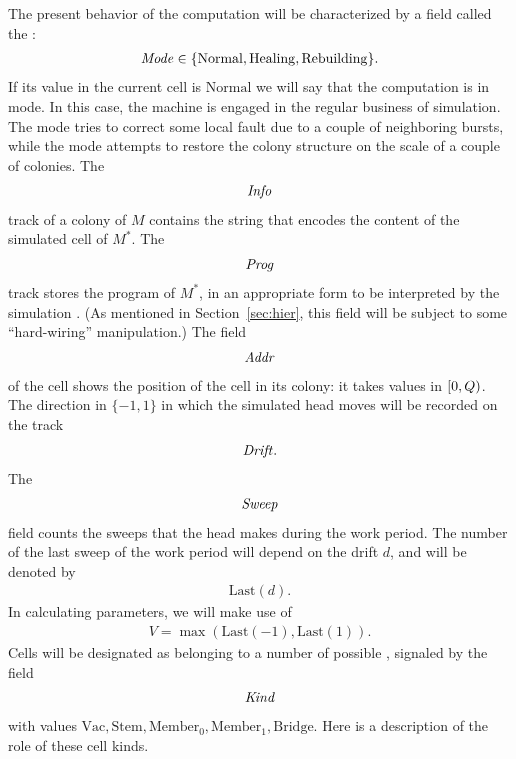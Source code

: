 \documentclass[11pt]{memoir}
\theoremstyle{definition} %
\newcommand{\fld}[1]{\ensuremath{\textit{#1\/}}}
\newcommand{\Vacant}{\mathrm{Vac}}
\newcommand{\Q}{Q}
\newcommand{\V}{V}
\newcommand{\Addr}{\fld{Addr}}
\newcommand{\Drift}{\fld{Drift}}
\newcommand{\Info}{\fld{Info}}
\newcommand{\Kind}{\fld{Kind}}
\newcommand{\Mode}{\fld{Mode}}
\newcommand{\Prog}{\fld{Prog}}
\newcommand{\Sweep}{\fld{Sweep}}
\newcommand{\Bridge}{\mathrm{Bridge}}
\newcommand{\Last}{\mathrm{Last}}
\newcommand{\Member}{\mathrm{Member}}
\newcommand{\Normal}{\mathrm{Normal}}
\newcommand{\Rebuilding}{\mathrm{Rebuilding}}
\newcommand{\Healing}{\mathrm{Healing}}
\newcommand{\Stem}{\mathrm{Stem}}
\begin{document}
The present behavior of the computation will be characterized by
a field called the :
 \begin{align*}
   \Mode\in\{ \Normal,\Healing, \Rebuilding \}.
 \end{align*}
 If its value in the current cell is \( \Normal \) we will say that the
 computation is in  mode.
 In this case, the machine is engaged in the regular business of simulation.
The  mode tries to correct some local fault due to a couple of neighboring
bursts, while the  mode attempts to restore the colony structure
on the scale of a couple of colonies.
The 
\begin{align*}
   \Info
 \end{align*}
track of a colony of \( M \)
contains the string that encodes the content of the simulated cell of \( M^{*} \).
The
\begin{align*}
 \Prog
 \end{align*}
track stores the program of \( M^{*} \), in an appropriate form 
to be interpreted by the simulation .
(As mentioned in Section~\ref{sec:hier}, this field will be subject to
some ``hard-wiring'' manipulation.)
The field 
 \begin{align*}
  \Addr
 \end{align*}
of the cell shows the position of the cell in its colony:
it takes values in \( \lint{0}{\Q} \).
The direction in \( \{-1,1\} \) in which the simulated head moves will be recorded on the track
 \begin{align*}
   \Drift.
 \end{align*}
The
 \begin{align*}
 \Sweep
 \end{align*}
field counts the sweeps that the head makes during the work period.
The number of the last sweep of the work period will depend on the drift \( d \), 
and will be denoted by 
\begin{align}\label{eq:Last}
   \Last(d).
 \end{align}
In calculating parameters, we will make use of  
\begin{align}\label{eq:V}
   \V=\max(\Last(-1),\Last(1)).
 \end{align}
Cells will be designated as belonging to a number of possible , signaled by the
field 
\begin{align*}
     \Kind
 \end{align*}
with values \(  \Vacant, \Stem, \Member_{0},\Member_{1},\Bridge \).
Here is a description of the role of these cell kinds.
\end{document}
